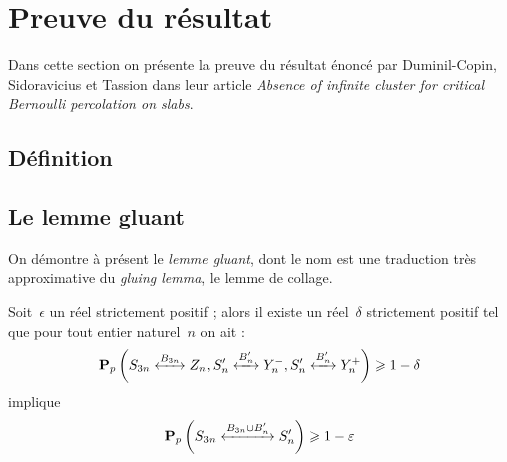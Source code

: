 
\chapter{Preuve du résultat}
	Dans cette section on présente la preuve du résultat énoncé par Duminil-Copin, Sidoravicius et Tassion dans leur article \emph{Absence of infinite cluster for critical Bernoulli percolation on slabs}.
	\section{Définition}
	
	\section{Le lemme gluant}
	On démontre à présent le \emph{lemme gluant}, dont le nom est une traduction très approximative du \emph{gluing lemma}, le lemme de collage.
	
	\begin{lem}
		Soit~$\epsilon$ un réel strictement positif ; alors il existe un réel~$\delta$ strictement positif tel que pour tout entier naturel~$n$ on ait :
		\[
			\Pp{\relie[B_{3n}]{S_{3n}}{Z_n},
				\relie[B_n']{S_n'}{Y_n^-},
				\relie[B_n']{S_n'}{Y_n^+}}
			\geq 1 - \delta
		\]
		implique
		\[
			\Pp{\relie[B_{3n}\cup B_n']{S_{3n}}{S_n'}}
			\geq 1 - \epsilon
		\]
	\end{lem}
	
\Tbreak
